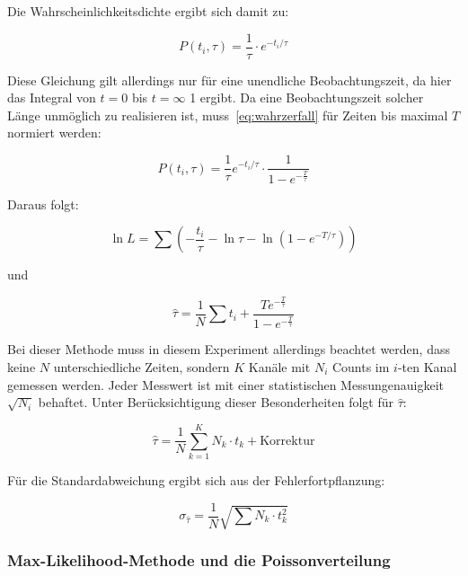 \documentclass[slug=LM, room=Andreas-Schubert-Bau\,\ K\ 1A, supervisor=Anne-Sophie\ Berthold, coursedate=13.\ 12.\ 2019]{../../Lab_Report_LaTeX/lab_report}
\begin{document}
Die Wahrscheinlichkeitsdichte ergibt sich damit zu:

\begin{equation}\label{eq:wahrzerfall}
 P(t_i,\tau) = \frac{1}{\tau} \cdot e^{-t_i/\tau}
\end{equation}

Diese Gleichung gilt allerdings nur für eine unendliche Beobachtungszeit, da hier das Integral
von \(t = 0\) bis \(t = \infty\) 1 ergibt.
Da eine Beobachtungszeit solcher Länge unmöglich zu realisieren ist, muss~\ref{eq:wahrzerfall}
für Zeiten bis maximal \(T\) normiert werden:

\begin{equation}\label{eq:modzerfall}
 P(t_i,\tau) = \frac{1}{\tau}e^{-t_i/\tau} \cdot \frac{1}{1-e^{-\frac{T}{\tau}}}
\end{equation}

Daraus folgt:

\begin{equation}\label{key}
 \ln L = \sum (-\frac{t_i}{\tau} - \ln\tau - \ln(1-e^{-T/\tau}))
\end{equation}

und

\begin{equation}\label{key}
 \hat\tau = \frac{1}{N} \sum t_i + \frac{T e^{-\frac{T}{\tau}}}{1-e^{-\frac{T}{\tau}}}
\end{equation}

Bei dieser Methode muss in diesem Experiment allerdings beachtet werden, dass keine \(N\)
unterschiedliche Zeiten, sondern \(K\) Kanäle mit \(N_i\) Counts im \(i\)-ten Kanal gemessen
werden. Jeder Messwert ist mit einer statistischen Messungenauigkeit \(\sqrt{N_i}\) behaftet.
Unter Berücksichtigung dieser Besonderheiten folgt für \(\hat\tau\):

\begin{equation}\label{key}
 \hat\tau = \frac{1}{N} \sum_{k=1}^{K}N_k\cdot t_k + \text{Korrektur}
\end{equation}

Für die Standardabweichung ergibt sich aus der Fehlerfortpflanzung:

\begin{equation}\label{key}
 \sigma_{\hat\tau} = \frac{1}{N} \sqrt{\sum N_k \cdot t_k^2}
\end{equation}

\subsubsection{Max-Likelihood-Methode und die Poissonverteilung}
\label{sec:likepoisson}
\end{document}
